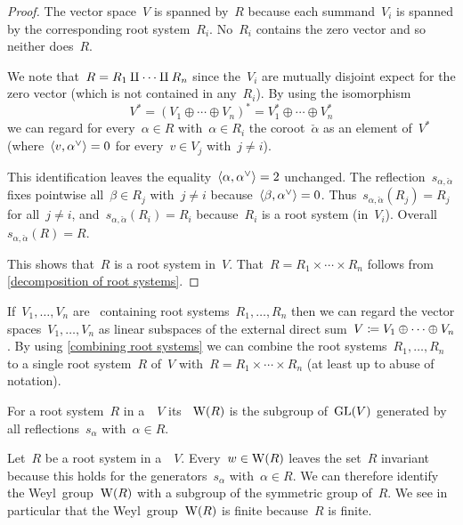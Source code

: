 \begin{proof}
  The vector space~$V$ is spanned by~$R$ because each summand~$V_i$ is spanned by the corresponding root system~$R_i$.
  No~$R_i$ contains the zero vector and so neither does~$R$.
  
  We note that~$R = R_1 \amalg \dotsb \amalg R_n$ since the~$V_i$ are mutually disjoint expect for the zero vector (which is not contained in any~$R_i$).
  By using the isomorphism
  \[
    V^*
    =
    (V_1 \oplus \dotsb \oplus V_n)^*
    =
    V_1^* \oplus \dotsb \oplus V_n^*
  \]
  we can regard for every~$\alpha \in R$ with~$\alpha \in R_i$ the coroot~$\check{\alpha}$ as an element of~$V^*$ (where~$\pair{v, \check{\alpha}} = 0$ for every~$v \in V_j$ with~$j \neq i$).
  
  This identification leaves the equality~$\pair{\alpha, \check{\alpha}} = 2$ unchanged.
  The reflection~$s_{\alpha, \check{\alpha}}$ fixes pointwise all~$\beta \in R_j$ with~$j \neq i$ because~$\pair{\beta, \check{\alpha}} = 0$.
  Thus~$s_{\alpha, \check{\alpha}}(R_j) = R_j$ for all~$j \neq i$, and~$s_{\alpha, \check{\alpha}}(R_i) = R_i$ because~$R_i$ is a root system (in~$V_i$).
  Overall~$s_{\alpha, \check{\alpha}}(R) = R$.
  
  This shows that~$R$ is a root system in~$V$.
  That~$R = R_1 \times \dotsb \times R_n$ follows from \cref{decomposition of root systems}.
\end{proof}


\begin{example}
  If~$V_1, \dotsc, V_n$ are~{\vectorspaces{$\kf$}} containing root systems~$R_1, \dotsc, R_n$ then we can regard the vector spaces~$V_1, \dotsc, V_n$ as linear subspaces of the external direct sum~$V \coloneqq V_1 \oplus \dotsb \oplus V_n$.
  By using \cref{combining root systems} we can combine the root systems~$R_1, \dotsc, R_n$ to a single root system~$R$ of~$V$ with~$R = R_1 \times \dotsb \times R_n$ (at least up to abuse of notation).
\end{example}


\begin{definition}
  For a root system~$R$ in a~{\vectorspace{$\kf$}}~$V$ its ~$\operatorname{W}(R)$ is the subgroup of~$\operatorname{GL}(V)$ generated by all reflections~$s_\alpha$ with~$\alpha \in R$.
\end{definition}


\begin{remark}
  Let~$R$ be a root system in a~{\vectorspace{$\kf$}}~$V$.
  Every~$w \in \operatorname{W}(R)$ leaves the set~$R$ invariant because this holds for the generators~$s_\alpha$ with~$\alpha \in R$.
  We can therefore identify the Weyl~group~$\operatorname{W}(R)$ with a subgroup of the symmetric group of~$R$.
  We see in particular that the Weyl~group~$\operatorname{W}(R)$ is finite because~$R$ is finite.
\end{remark}


